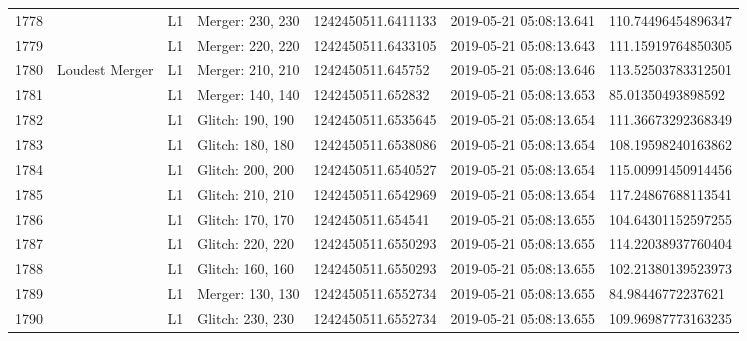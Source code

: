 \begin{longtable}{lllllll}
1778 &                                                    &       L1 &  Merger: 230, 230 &  1242450511.6411133 &  2019-05-21 05:08:13.641 &  110.74496454896347 \\
1779 &                                                    &       L1 &  Merger: 220, 220 &  1242450511.6433105 &  2019-05-21 05:08:13.643 &  111.15919764850305 \\
1780 &                                     Loudest Merger &       L1 &  Merger: 210, 210 &   1242450511.645752 &  2019-05-21 05:08:13.646 &  113.52503783312501 \\
1781 &                                                    &       L1 &  Merger: 140, 140 &   1242450511.652832 &  2019-05-21 05:08:13.653 &   85.01350493898592 \\
1782 &                                                    &       L1 &  Glitch: 190, 190 &  1242450511.6535645 &  2019-05-21 05:08:13.654 &  111.36673292368349 \\
1783 &                                                    &       L1 &  Glitch: 180, 180 &  1242450511.6538086 &  2019-05-21 05:08:13.654 &  108.19598240163862 \\
1784 &                                                    &       L1 &  Glitch: 200, 200 &  1242450511.6540527 &  2019-05-21 05:08:13.654 &  115.00991450914456 \\
1785 &                                                    &       L1 &  Glitch: 210, 210 &  1242450511.6542969 &  2019-05-21 05:08:13.654 &  117.24867688113541 \\
1786 &                                                    &       L1 &  Glitch: 170, 170 &   1242450511.654541 &  2019-05-21 05:08:13.655 &  104.64301152597255 \\
1787 &                                                    &       L1 &  Glitch: 220, 220 &  1242450511.6550293 &  2019-05-21 05:08:13.655 &  114.22038937760404 \\
1788 &                                                    &       L1 &  Glitch: 160, 160 &  1242450511.6550293 &  2019-05-21 05:08:13.655 &  102.21380139523973 \\
1789 &                                                    &       L1 &  Merger: 130, 130 &  1242450511.6552734 &  2019-05-21 05:08:13.655 &   84.98446772237621 \\
1790 &                                                    &       L1 &  Glitch: 230, 230 &  1242450511.6552734 &  2019-05-21 05:08:13.655 &  109.96987773163235 \\

\end{longtable}
